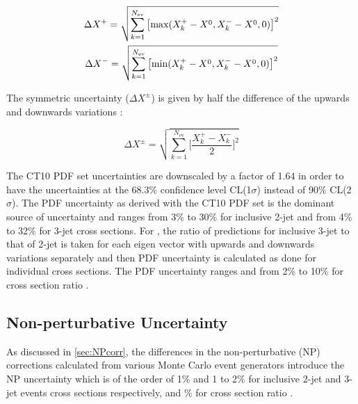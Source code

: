 \begin{equation}
\label{eq:unc_pdf}
\begin{gathered}
\Delta X^+ =  \sqrt{\sum \limits_{k=1}^{N_\mathrm{ev}}\big[{\rm max}(X^{+}_{k}-X^{0},X^{-}_{k}-X^{0},0)\big]^2} \\
\Delta X^- =  \sqrt{\sum \limits_{k=1}^{N_\mathrm{ev}}\big[{\rm min}(X^{+}_{k}-X^{0},X^{-}_{k}-X^{0},0)\big]^2}
\end{gathered}
\end{equation}

The symmetric uncertainty ($\Delta X^{\pm}$) is given by half the difference of the upwards and downwards variations :

\begin{equation}
\label{eq:unc_pdf_symm}
\Delta X^{\pm} = \sqrt{\sum \limits_{k=1}^{N_\mathrm{ev}} \Bigg[\frac{X^{+}_{k}-X^{-}_{k}}{2}\Bigg]^2}
\end{equation}

The CT10 PDF set uncertainties are downscaled by a factor of 1.64 in order to have the uncertainties at the 68.3\% confidence level CL(1$\sigma$) instead of 90\% CL(2$\sigma$). The PDF uncertainty as derived with the CT10 PDF set is the dominant source of uncertainty and ranges from 3\% to 30\% for inclusive 2-jet and from 4\% to 32\% for 3-jet cross sections. For \ratio, the ratio of predictions for inclusive 3-jet to that of 2-jet is taken for each eigen vector with upwards and downwards variations separately and then PDF uncertainty is calculated as done for individual cross sections. The PDF uncertainty ranges and from 2\% to 10\% for cross section ratio \ratio.

\subsection{Non-perturbative Uncertainty}
As discussed in \ref{sec:NPcorr}, the differences in the non-perturbative (NP) corrections calculated from various Monte Carlo event generators introduce the NP uncertainty which is of the order of 1\% and 1 to 2\% for inclusive 2-jet and 3-jet events cross sections respectively, and \% for cross section ratio \ratio.

